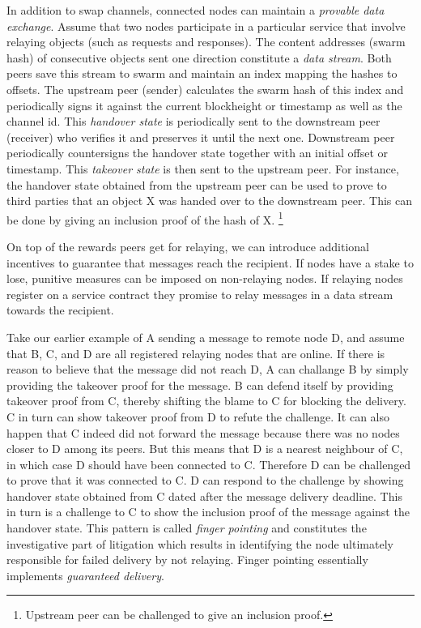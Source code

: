 \documentclass[a4paper,10pt]{article}
\newcommand\gloss[1]{\emph{\gls{#1}}}
\begin{document}
In addition to swap channels, connected nodes can maintain a \gloss{provable data exchange}.
Assume that two nodes participate in a particular service that involve
relaying objects (such as requests and responses).
The content addresses (swarm hash) of consecutive objects
sent one direction constitute a \emph{data stream}.
Both peers save this stream to swarm and maintain an index mapping the hashes to offsets.
The upstream peer (sender) calculates the swarm hash of this index and periodically
signs it against the current blockheight or timestamp as well as the channel id.
This \gloss{handover state} is periodically sent to the downstream peer (receiver)
who verifies it and preserves it until the next one.
Downstream peer periodically countersigns the handover state together with an initial
offset or timestamp. This \gloss{takeover state} is then sent to the upstream peer.
For instance, the handover state obtained from the upstream peer can be used to prove to third parties
that an object X was handed over to the downstream peer. This can be done by
giving an inclusion proof of the hash of X.%
%
\footnote{Upstream peer can be challenged to give an inclusion proof.}

On top of the rewards peers get for relaying, we can introduce additional
incentives to guarantee that messages reach the recipient.
If nodes have a stake to lose, punitive measures can be imposed on non-relaying nodes.
If relaying nodes register on a service contract they promise to relay messages in a data stream
towards the recipient.

Take our earlier example of A sending a message to remote node D, and assume that
B, C, and D are all registered relaying nodes that are online. If there is reason
to believe that the message did not reach D, A can challange B by simply providing
the takeover proof for the message. B can defend itself by providing takeover proof from C,
thereby shifting the blame to C for blocking the delivery. C in turn can show takeover proof
from D to refute the challenge. It can also happen that C indeed did not forward the message
because there was no nodes closer to D among its peers. But this means that
D is a nearest neighbour of C, in which case D should have been connected to C.
Therefore D can be challenged to prove that it was connected to C. D can respond to the challenge
by showing handover state obtained from C dated after the message delivery deadline. This in turn is
a challenge to C to show the inclusion proof of the message against the handover state.
This pattern is called \gloss{finger pointing} and constitutes the investigative part
of litigation which results in identifying the node
ultimately responsible for failed delivery by not relaying.
Finger pointing essentially implements \emph{guaranteed delivery}.
\end{document}

